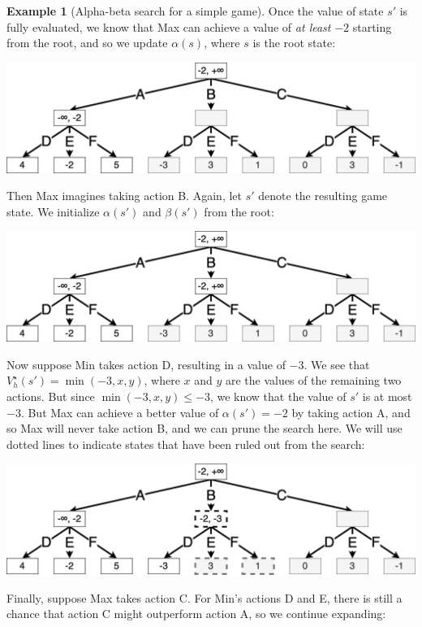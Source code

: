 \documentclass[
  letterpaper,
  DIV=11,
  numbers=noendperiod]{scrreprt}
\theoremstyle{plain}
\theoremstyle{plain}
\theoremstyle{definition}
\newtheorem{example}{Example}[chapter]
\theoremstyle{definition}
\theoremstyle{remark}
\begin{document}
\begin{example}[Alpha-beta search for a simple
game]
Once the value of state \(s'\) is fully evaluated, we know that Max can
achieve a value of \emph{at least} \(-2\) starting from the root, and so
we update \(\alpha(s)\), where \(s\) is the root state:

\includegraphics{./shared/alpha-beta-4.png}

Then Max imagines taking action B. Again, let \(s'\) denote the
resulting game state. We initialize \(\alpha(s')\) and \(\beta(s')\)
from the root:

\includegraphics{./shared/alpha-beta-5.png}

Now suppose Min takes action D, resulting in a value of \(-3\). We see
that \(V^\star_h(s') = \min(-3, x, y)\), where \(x\) and \(y\) are the
values of the remaining two actions. But since
\(\min(-3, x, y) \le -3\), we know that the value of \(s'\) is at most
\(-3\). But Max can achieve a better value of \(\alpha(s') = -2\) by
taking action A, and so Max will never take action B, and we can prune
the search here. We will use dotted lines to indicate states that have
been ruled out from the search:

\includegraphics{./shared/alpha-beta-6.png}

Finally, suppose Max takes action C. For Min's actions D and E, there is
still a chance that action C might outperform action A, so we continue
expanding:


\end{example}
\end{document}
